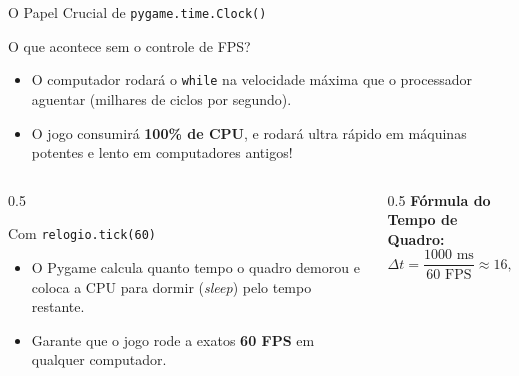 \begin{frame}{O Papel Crucial de \texttt{pygame.time.Clock()}}
    \begin{block}{O que acontece sem o controle de FPS?}
        \begin{itemize}
            \item O computador rodará o \texttt{while} na velocidade máxima que o processador aguentar (milhares de ciclos por segundo).
            \item O jogo consumirá \textbf{100\% de CPU}, e rodará ultra rápido em máquinas potentes e lento em computadores antigos!
        \end{itemize}
    \end{block}

    \vspace{0.3cm}
    \begin{columns}
        \begin{column}{0.5\textwidth}
            \begin{block}{Com \texttt{relogio.tick(60)}}
                \begin{itemize}
                    \item O Pygame calcula quanto tempo o quadro demorou e coloca a CPU para dormir (\textit{sleep}) pelo tempo restante.
                    \item Garante que o jogo rode a exatos \textbf{60 FPS} em qualquer computador.
                \end{itemize}
            \end{block}
        \end{column}
        \begin{column}{0.5\textwidth}
            \textbf{Fórmula do Tempo de Quadro:}
            \[
                \Delta t = \frac{1000\text{ ms}}{60\text{ FPS}} \approx 16{,}6\text{ ms por quadro}
            \]
        \end{column}
    \end{columns}
\end{frame}

